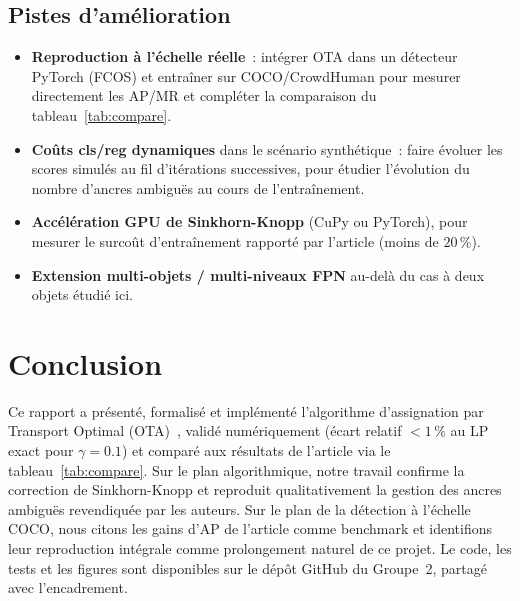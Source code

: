 \documentclass[11pt,a4paper]{article}
\begin{document}
\subsection{Pistes d'amélioration}
\begin{itemize}
  \item \textbf{Reproduction à l'échelle réelle}~: intégrer OTA dans un détecteur PyTorch (FCOS) et entraîner sur COCO/CrowdHuman pour mesurer directement les AP/MR et compléter la comparaison du tableau~\ref{tab:compare}.
  \item \textbf{Coûts cls/reg dynamiques} dans le scénario synthétique~: faire évoluer les scores simulés au fil d'itérations successives, pour étudier l'évolution du nombre d'ancres ambiguës au cours de l'entraînement.
  \item \textbf{Accélération GPU de Sinkhorn-Knopp} (CuPy ou PyTorch), pour mesurer le surcoût d'entraînement rapporté par l'article (moins de $20\,\%$).
  \item \textbf{Extension multi-objets / multi-niveaux FPN} au-delà du cas à deux objets étudié ici.
\end{itemize}

\section{Conclusion}
Ce rapport a présenté, formalisé et implémenté l'algorithme d'assignation par Transport Optimal (OTA)~\cite{ge2021ota}, validé numériquement (écart relatif $<1\,\%$ au LP exact pour $\gamma=0.1$) et comparé aux résultats de l'article via le tableau~\ref{tab:compare}. Sur le plan algorithmique, notre travail confirme la correction de Sinkhorn-Knopp et reproduit qualitativement la gestion des ancres ambiguës revendiquée par les auteurs. Sur le plan de la détection à l'échelle COCO, nous citons les gains d'AP de l'article comme benchmark et identifions leur reproduction intégrale comme prolongement naturel de ce projet. Le code, les tests et les figures sont disponibles sur le dépôt GitHub du Groupe~2, partagé avec l'encadrement.



\end{document}

